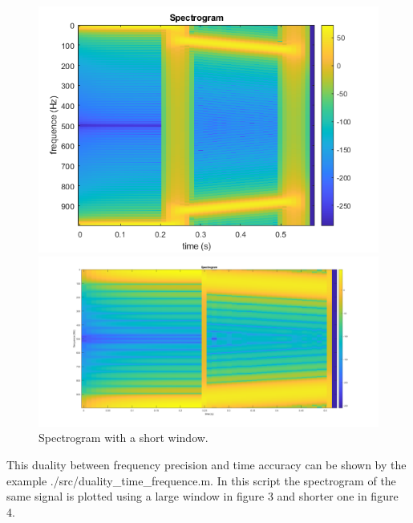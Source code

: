 \documentclass{article}
\begin{document}
\begin{figure}[H]

\begin{subfigure}

\centerline{\includegraphics[scale = 0.6]{figure_3_large_window.png}}
\caption{Spectrogram with a large window.}
\end{subfigure}

\begin{subfigure}

\centerline{\includegraphics[scale = 0.2]{figure_4_short_window.png}}
\caption{Spectrogram with a short window.}
\end{subfigure}

\end{figure}

This duality between frequency precision and time accuracy can be shown by the example ./src/duality\_time\_frequence.m. In this script the spectrogram of the same signal is plotted using a large window in figure 3 and shorter one in figure 4.
\end{document}
